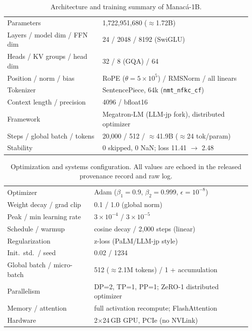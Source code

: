 \documentclass[11pt]{article}
\begin{document}
\begin{table}[t]
\centering
\caption{Architecture and training summary of Manac\'a-1B.}
\label{tab:arch}
\small
\begin{tabular}{ll}
\toprule
Parameters & 1{,}722{,}951{,}680 ($\approx$1.72B) \\
Layers / model dim / FFN dim & 24 / 2048 / 8192 (SwiGLU) \\
Heads / KV groups / head dim & 32 / 8 (GQA) / 64 \\
Position / norm / bias & RoPE ($\theta{=}5{\times}10^{5}$) / RMSNorm / all linears \\
Tokenizer & SentencePiece, 64k (\texttt{nmt\_nfkc\_cf}) \\
Context length / precision & 4096 / bfloat16 \\
Framework & Megatron-LM (LLM-jp fork), distributed optimizer \\
Steps / global batch / tokens & 20{,}000 / 512 / $\approx$41.9B ($\approx$24 tok/param) \\
Stability & 0 skipped, 0 NaN; loss 11.41 $\rightarrow$ 2.48 \\
\bottomrule
\end{tabular}
\end{table}

\begin{table}[t]
\centering
\caption{Optimization and systems configuration. All values are echoed in the released
provenance record and raw log.}
\label{tab:opt}
\small
\begin{tabular}{ll}
\toprule
Optimizer & Adam ($\beta_1{=}0.9$, $\beta_2{=}0.999$, $\epsilon{=}10^{-8}$) \\
Weight decay / grad clip & 0.1 / 1.0 (global norm) \\
Peak / min learning rate & $3\times10^{-4}$ / $3\times10^{-5}$ \\
Schedule / warmup & cosine decay / 2{,}000 steps (linear) \\
Regularization & z-loss (PaLM/LLM-jp style) \\
Init.\ std.\ / seed & 0.02 / 1234 \\
Global batch / micro-batch & 512 ($\approx$2.1M tokens) / 1 + accumulation \\
Parallelism & DP=2, TP=1, PP=1; ZeRO-1 distributed optimizer \\
Memory / attention & full activation recompute; FlashAttention \\
Hardware & 2$\times$24\,GB GPU, PCIe (no NVLink) \\
\bottomrule
\end{tabular}
\end{table}
\end{document}

